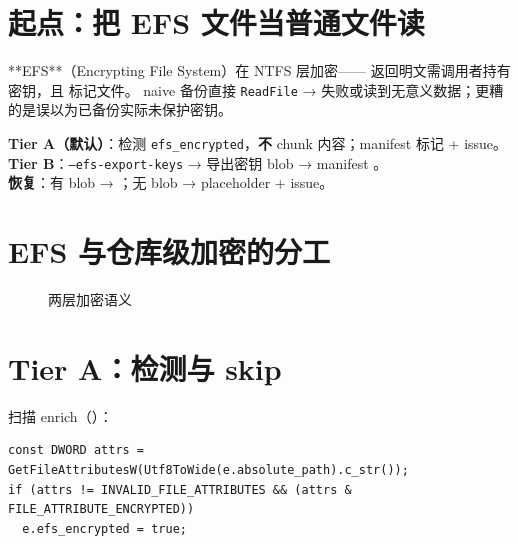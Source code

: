 
\section{起点：把 EFS 文件当普通文件读}

**EFS**（Encrypting File System）在 NTFS 层加密—— 返回明文需调用者持有密钥，且  标记文件。
 naive 备份直接 \texttt{ReadFile} → 失败或读到无意义数据；更糟的是误以为已备份实际未保护密钥。

\begin{evolbox}
\textbf{Tier A（默认）}：检测 \texttt{efs\_encrypted}，\textbf{不} chunk 内容；manifest 标记 + issue。\\
\textbf{Tier B}：\texttt{--efs-export-keys} →  导出密钥 blob → manifest 。\\
\textbf{恢复}：有 blob → ；无 blob → placeholder + issue。
\end{evolbox}

\section{EFS 与仓库级加密的分工}

\begin{figure}[htbp]
\centering
{}
\caption{两层加密语义}
\end{figure}

\section{Tier A：检测与 skip}

扫描 enrich（）：

\begin{lstlisting}[caption={EFS 检测 (scan\_entry.cc)}]
const DWORD attrs = GetFileAttributesW(Utf8ToWide(e.absolute_path).c_str());
if (attrs != INVALID_FILE_ATTRIBUTES && (attrs & FILE_ATTRIBUTE_ENCRYPTED))
  e.efs_encrypted = true;
\end{lstlisting}

